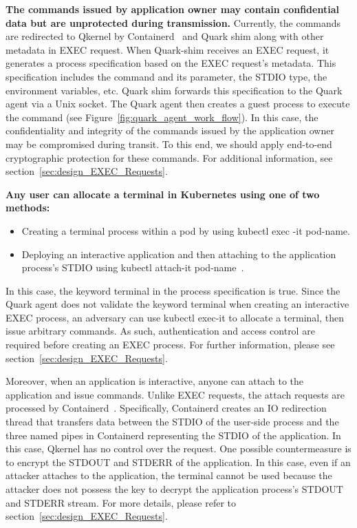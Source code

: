 \textbf{The commands issued by application owner may contain confidential data but are unprotected during transmission.} Currently, the commands are redirected to Qkernel by Containerd~\cite*{containerd} and Quark shim along with other metadata in EXEC request. When Quark-shim receives an EXEC request, it generates 
a process specification based on the EXEC request’s metadata. This specification includes the command and its parameter, the STDIO type, the environment variables, etc. Quark shim forwards this specification to the Quark agent via a Unix socket. The Quark agent then creates a guest process to 
execute the command (see Figure~\ref{fig:quark_agent_work_flow}). In this case, the confidentiality and integrity of the commands issued by the application owner may be compromised during transit. To this end, we should apply end-to-end cryptographic protection for these 
commands. For additional information, see section~\ref{sec:design_EXEC_Requests}.


\textbf{Any user can allocate a terminal in Kubernetes using one of two methods:}

\begin{itemize}
  \item Creating a terminal process within a pod by using kubectl exec -it pod-name.
  \item Deploying an interactive application and then attaching to the application process's STDIO using kubectl attach-it pod-name~\cite*{Understanding_sdin}.
\end{itemize}
In this case, the keyword terminal in the process specification is true. Since the Quark agent does not validate the keyword terminal when creating an interactive EXEC process, an adversary can use kubectl exec-it to allocate a terminal, then issue 
arbitrary commands. As such, authentication and access control are required before creating an EXEC process. For further information, please see section~\ref{sec:design_EXEC_Requests}.


Moreover, when an application is interactive, anyone can attach to the application and issue commands. Unlike EXEC requests, the attach requests are processed by Containerd~\cite*{containerd}. Specifically, Containerd creates an IO redirection thread that transfers data between the STDIO of the 
user-side process and the three named pipes in Containerd representing the STDIO of the application. In this case, Qkernel has no control over the request. One possible countermeasure is to encrypt the STDOUT and STDERR of the application. In this case, even if an attacker attaches to the application, 
the terminal cannot be used because the attacker does not possess the key to decrypt the application process’s STDOUT and STDERR stream. For more details, please refer to section~\ref{sec:design_EXEC_Requests}.


